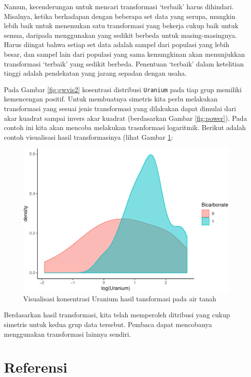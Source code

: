 \documentclass[]{book}
\begin{document}
Namun, kecenderungan untuk mencari transformasi `terbaik' harus
dihindari. Misalnya, ketika berhadapan dengan beberapa set data yang
serupa, mungkin lebih baik untuk menemukan satu transformasi yang
bekerja cukup baik untuk semua, daripada menggunakan yang sedikit
berbeda untuk masing-masingnya. Harus diingat bahwa setiap set data
adalah sampel dari populasi yang lebih besar, dan sampel lain dari
populasi yang sama kemungkinan akan menunjukkan transformasi `terbaik'
yang sedikit berbeda. Penentuan `terbaik' dalam ketelitian tinggi adalah
pendekatan yang jarang sepadan dengan usaha.

Pada Gambar \ref{fig:gwvis2} kosentrasi distribusi \texttt{Uranium} pada
tiap grup memiliki kemencengan positif. Untuk membuatnya simetris kita
perlu melakukan transformasi yang sesuai jenis transformasi yang
dilakukan dapat dimulai dari akar kuadrat sampai invers akar kuadrat
(berdasarkan Gambar \ref{fig:power}). Pada contoh ini kita akan mencoba
melakukan trasnformasi logaritmik. Berikut adalah contoh visualisasi
hasil transformasinya (lihat Gambar \ref{fig:urantrans}:

\begin{figure}

{\centering \includegraphics[width=0.7\linewidth]{EnvStat_files/figure-latex/urantrans-1} 

}

\caption{Visualisasi konsentrasi Uranium  hasil tansformasi pada air tanah}\label{fig:urantrans}
\end{figure}

Berdasarkan hasil transformasi, kita telah memperoleh ditribusi yang
cukup simetris untuk kedua grup data tersebut. Pembaca dapat mencobanya
menggunakan transformasi lainnya sendiri.

\section{Referensi}\label{referensi-5}
\end{document}
